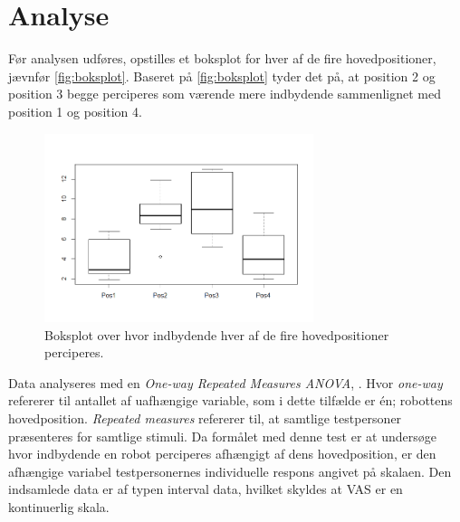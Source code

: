 \section*{Analyse}
\label{Analyse}
%
Før analysen udføres, opstilles et boksplot for hver af de fire hovedpositioner, jævnfør \autoref{fig:boksplot}. Baseret på \autoref{fig:boksplot} tyder det på, at position 2 og position 3 begge perciperes som værende mere indbydende sammenlignet med position 1 og position 4.   
%
\begin{figure}[H]
\centering
\includegraphics[width = 0.7\textwidth]{Figure/Rplot.png} 
\caption{Boksplot over hvor indbydende hver af de fire hovedpositioner perciperes.}
\label{fig:boksplot}
\end{figure}
\noindent
%
Data analyseres med en \textit{One-way Repeated Measures ANOVA}, \parencite[s. 554]{DiscoveringStatisticsUsingR}. Hvor \textit{one-way} refererer til antallet af uafhængige variable, som i dette tilfælde er én; robottens hovedposition. \textit{Repeated measures} refererer til, at samtlige testpersoner præsenteres for samtlige stimuli. Da formålet med denne test er at undersøge hvor indbydende en robot perciperes afhængigt af dens hovedposition, er den afhængige variabel testpersonernes individuelle respons angivet på skalaen. Den indsamlede data er af typen interval data, hvilket skyldes at VAS er en kontinuerlig skala. 

